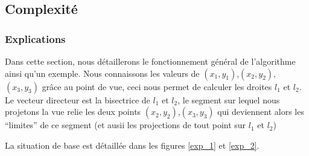 \documentclass[11pt,a4paper]{article}
\begin{document}
\subsection{Complexité}

\subsubsection{Explications}
Dans cette section, nous détaillerons le fonctionnement général de l'algorithme ainsi qu'un exemple.
Nous connaissons les valeurs de $(x_1,y_1)$,$(x_2,y_2)$,$(x_3,y_3)$ grâce au point de vue, ceci nous permet de calculer les droites $l_1$ et $l_2$.
Le vecteur directeur est la bisectrice de $l_1$ et $l_2$, le segment sur lequel nous projetons la vue relie les deux points $(x_2,y_2)$,$(x_3,y_3)$ qui deviennent alors les "`limites"' de ce segment (et ausii les projections de tout point sur $l_1$ et $l_2$)

La situation de base est détaillée dans les figures \ref{exp_1} et \ref{exp_2}.
\end{document}
